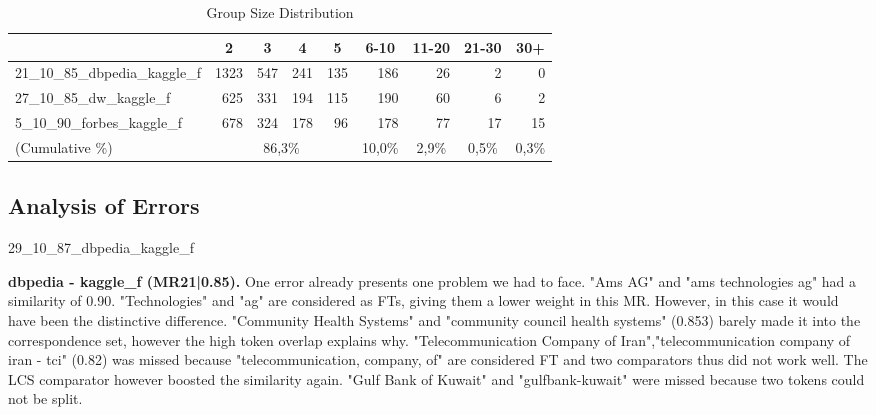 \documentclass[11pt,titlepage,oneside,openany]{article}
\begin{document}
\begin{table}[]
	\centering
	\begin{tabular}{lllllllll}
		& \multicolumn{1}{c}{2}    & \multicolumn{1}{c}{3}   & \multicolumn{1}{c}{4}   & \multicolumn{1}{c}{5}   & \multicolumn{1}{c}{6-10}   & \multicolumn{1}{c}{11-20} & \multicolumn{1}{c}{21-30} & \multicolumn{1}{c}{30+}   \\\hline
		21\_10\_85\_dbpedia\_kaggle\_f & \multicolumn{1}{r}{1323} & \multicolumn{1}{r}{547} & \multicolumn{1}{r}{241} & \multicolumn{1}{r}{135} & \multicolumn{1}{r}{186}    & \multicolumn{1}{r}{26}    & \multicolumn{1}{r}{2}     & \multicolumn{1}{r}{0}     \\
		27\_10\_85\_dw\_kaggle\_f      & \multicolumn{1}{r}{625}  & \multicolumn{1}{r}{331} & \multicolumn{1}{r}{194} & \multicolumn{1}{r}{115} & \multicolumn{1}{r}{190}    & \multicolumn{1}{r}{60}    & \multicolumn{1}{r}{6}     & \multicolumn{1}{r}{2}     \\
		5\_10\_90\_forbes\_kaggle\_f   & \multicolumn{1}{r}{678}  & \multicolumn{1}{r}{324} & \multicolumn{1}{r}{178} & \multicolumn{1}{r}{96}  & \multicolumn{1}{r}{178}    & \multicolumn{1}{r}{77}    & \multicolumn{1}{r}{17}    & \multicolumn{1}{r}{15}    \\\hline
		(Cumulative \%)& \multicolumn{4}{c}{86,3\%}                                                                             & \multicolumn{1}{c}{10,0\%} & \multicolumn{1}{c}{2,9\%} & \multicolumn{1}{c}{0,5\%} & \multicolumn{1}{c}{0,3\%} \\                    
	\end{tabular}
\caption[Group Size Distribution]{Group Size Distribution}
\label{tab:group-size-dist}
\end{table}


\subsection{Analysis of Errors}
\label{sec:errors}
29\_10\_87\_dbpedia\_kaggle\_f





\textbf{dbpedia - kaggle\_f (MR21|0.85). } One error already presents one problem we had to face. "Ams AG" and "ams technologies ag" had a similarity of 0.90. "Technologies" and "ag" are considered as FTs, giving them a lower weight in this MR. However, in this case it would have been the distinctive difference. "Community Health Systems" and "community council health systems" (0.853) barely made it into the correspondence set, however the high token overlap explains why. "Telecommunication Company of Iran","telecommunication company of iran - tci" (0.82) was missed because "telecommunication, company, of" are considered FT and two comparators thus did not work well. The LCS comparator however boosted the similarity again. "Gulf Bank of Kuwait" and "gulfbank-kuwait" were missed because two tokens could not be split.
\end{document}
